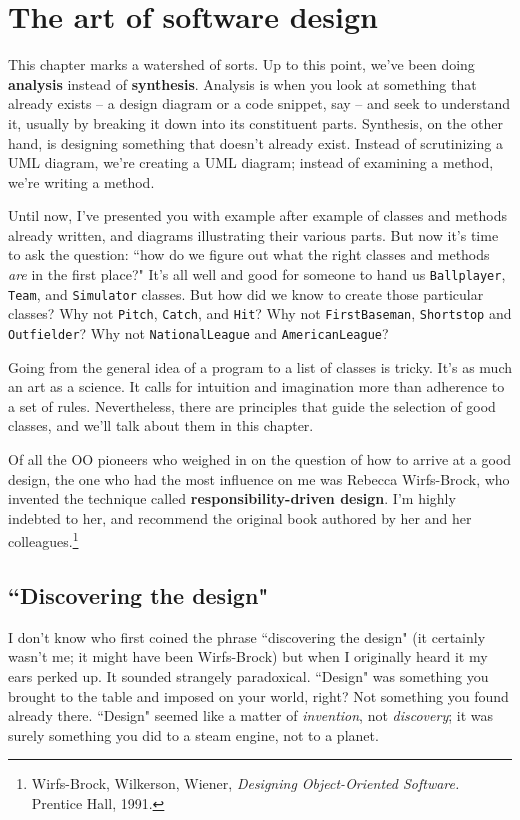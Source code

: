 
\chapter{The art of software design}

This chapter marks a watershed of sorts. Up to this point, we've been doing
\textbf{analysis} instead of \textbf{synthesis}. Analysis is when you look at
something that already exists -- a design diagram or a code snippet, say --
and seek to understand it, usually by breaking it down into its constituent
parts. Synthesis, on the other hand, is designing something that doesn't
already exist. Instead of scrutinizing a UML diagram, we're creating a UML
diagram; instead of examining a method, we're writing a method.

Until now, I've presented you with example after example of classes and
methods already written, and diagrams illustrating their various parts. But
now it's time to ask the question: ``how do we figure out what the right
classes and methods \textit{are} in the first place?" It's all well and good
for someone to hand us \texttt{Ballplayer}, \texttt{Team}, and
\texttt{Simulator} classes. But how did we know to create those particular
classes? Why not \texttt{Pitch}, \texttt{Catch}, and \texttt{Hit}? Why not
\texttt{FirstBaseman}, \texttt{Shortstop} and \texttt{Outfielder}? Why not
\texttt{NationalLeague} and \texttt{AmericanLeague}?

Going from the general idea of a program to a list of classes is tricky. It's
as much an art as a science. It calls for intuition and imagination more than
adherence to a set of rules. Nevertheless, there are principles that guide the
selection of good classes, and we'll talk about them in this chapter.

Of all the OO pioneers who weighed in on the question of how to arrive at a
good design, the one who had the most influence on me was Rebecca Wirfs-Brock,
who invented the technique called \textbf{responsibility-driven design}. I'm
highly indebted to her, and recommend the original book authored by her and
her colleagues.\footnote{Wirfs-Brock, Wilkerson, Wiener, \textit{Designing
Object-Oriented Software.} Prentice Hall, 1991.}

\section{``Discovering the design"}

I don't know who first coined the phrase ``discovering the design" (it
certainly wasn't me; it might have been Wirfs-Brock) but when I originally
heard it my ears perked up. It sounded strangely paradoxical. ``Design" was
something you brought to the table and imposed on your world, right? Not
something you found already there. ``Design" seemed like a matter of
\textit{invention}, not \textit{discovery}; it was surely something you did to
a steam engine, not to a planet.

